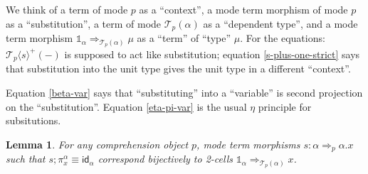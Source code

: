 \documentclass[10pt]{article}
\newtheorem{lemma}{Lemma}
\theoremstyle{definition}
\newcommand{\Yields}{\tcell}
\newcommand{\tcell}{\Rightarrow}
\newcommand{\id}{\mathsf{id}}
\newcommand\TrPlus[2]{\ensuremath{{#1}^+(#2)}}
\newcommand\El[2]{\mathcal{T}_{#1}(#2)}
\newcommand\ApEl[2]{\mathcal{T}_{#1}\langle#2\rangle}
\newcommand\One{\ensuremath{\mathds{1}}}
\begin{document}
We think of a term of mode $p$ as a ``context'', a mode term morphism of
mode $p$ as a ``substitution'', a term of mode $\El{p}{\alpha}$ as a
``dependent type'', and a mode term morphism $\One_\alpha
\Yields_{\El{p}{\alpha}} \mu$ as a ``term'' of ``type'' $\mu$.  For the
equations: $\TrPlus{\ApEl{p}{s}}{-}$ is supposed to act like
substitution; equation \eqref{s-plus-one-strict} says that substitution
into the unit type gives the unit type in a different ``context''.

Equation \eqref{beta-var} says that ``substituting'' into a ``variable'' is second projection on the ``substitution''.  Equation \eqref{eta-pi-var} is the usual $\eta$ principle for subsitutions.

\begin{lemma}\label{sigma:total-to-fiber0} 
For any comprehension object $p$, mode term morphisms $s : \alpha \tcell_p \alpha.x$ such that $s;\pi^\alpha_x \equiv \id_\alpha$ correspond bijectively to 2-cells $\One_\alpha \tcell_{\El{p}{\alpha}} x$.
\end{lemma}
\end{document}
